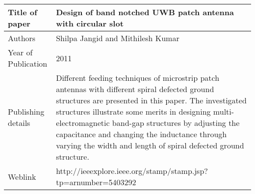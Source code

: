\documentclass{article}
\begin{document}
\begin{table}
  \centering
	\begin{tabular}{ |l|p{11cm}| }
			\hline
		     Title of paper &  Design of band notched UWB patch antenna with circular slot  \\
		     \hline
			 Authors & Shilpa Jangid and Mithilesh Kumar \\
			\hline
			 Year of Publication & 2011 \\
			\hline
			 Publishing details & Different feeding techniques of microstrip patch antennas with different spiral defected ground structures are presented in this paper. The investigated structures illustrate some merits in designing multi-electromagnetic band-gap structures by adjusting the capacitance and changing the inductance through varying the width and length of spiral defected ground structure.\\
			\hline
			 Weblink & http://ieeexplore.ieee.org/stamp/stamp.jsp?tp=arnumber=5403292 \\
			 \hline			 
	\end{tabular}		

\end{table}
\end{document}
